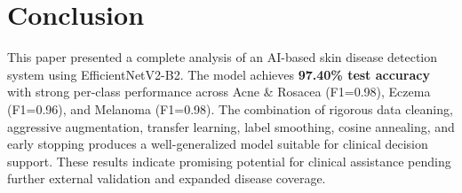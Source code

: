 \documentclass[10pt,a4paper,twocolumn]{article}
\begin{document}
\section{Conclusion}

This paper presented a complete analysis of an AI-based skin disease detection system using EfficientNetV2-B2. The model achieves \textbf{97.40\% test accuracy} with strong per-class performance across Acne \& Rosacea (F1=0.98), Eczema (F1=0.96), and Melanoma (F1=0.98). The combination of rigorous data cleaning, aggressive augmentation, transfer learning, label smoothing, cosine annealing, and early stopping produces a well-generalized model suitable for clinical decision support. These results indicate promising potential for clinical assistance pending further external validation and expanded disease coverage.
\end{document}
